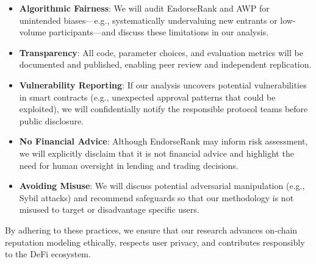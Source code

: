\begin{itemize}
\item[\textbullet] \textbf{Algorithmic Fairness}: We will audit EndorseRank and AWP for unintended biases---e.g., systematically undervaluing new entrants or low-volume participants---and discuss these limitations in our analysis.
\item[\textbullet] \textbf{Transparency}: All code, parameter choices, and evaluation metrics will be documented and published, enabling peer review and independent replication.
\end{itemize}

\begin{itemize}
\item[\textbullet] \textbf{Vulnerability Reporting}: If our analysis uncovers potential vulnerabilities in smart contracts (e.g., unexpected approval patterns that could be exploited), we will confidentially notify the responsible protocol teams before public disclosure.
\end{itemize}

\begin{itemize}
\item[\textbullet] \textbf{No Financial Advice}: Although EndorseRank may inform risk assessment, we will explicitly disclaim that it is not financial advice and highlight the need for human oversight in lending and trading decisions.
\item[\textbullet] \textbf{Avoiding Misuse}: We will discuss potential adversarial manipulation (e.g., Sybil attacks) and recommend safeguards so that our methodology is not misused to target or disadvantage specific users.
\end{itemize}
By adhering to these practices, we ensure that our research advances on-chain reputation modeling ethically, respects user privacy, and contributes responsibly to the DeFi ecosystem.
